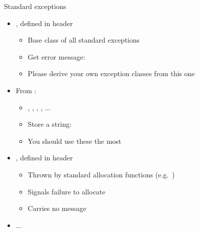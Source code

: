 \begin{frame}[fragile]
  \begin{block}{Standard exceptions}
    \begin{itemize}
      \item {}, defined in header 
      \begin{itemize}
        \item Base class of all standard exceptions
        \item Get error message: 
        \item Please derive your own exception classes from this one
      \end{itemize}
      \item From :
      \begin{itemize}
        \item {}, , , , ...
        \item Store a string: 
        \item You should use these the most
      \end{itemize}
      \item {}, defined in header 
      \begin{itemize}
        \item Thrown by standard allocation functions (e.g.\ )
        \item Signals failure to allocate
        \item Carries no message
      \end{itemize}
      \item ...
    \end{itemize}
  \end{block}
\end{frame}

